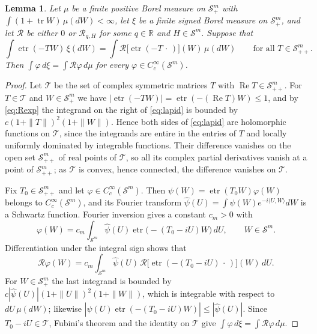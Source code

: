 \documentclass{amsart}
\newtheorem{lemma}[theorem]{Lemma}
\theoremstyle{definition}
\theoremstyle{remark}
\numberwithin{equation}{section}
\newcommand{\R}{\mathbb{R}}
\newcommand{\Sym}{\mathcal{S}}
\newcommand{\Rop}{\mathcal{R}}
\newcommand{\tr}{\operatorname{tr}}
\newcommand{\etr}{\operatorname{etr}}
\newcommand{\ip}[2]{\langle #1,#2\rangle}
\begin{document}
\begin{lemma}\label{lem:fourier}
Let $\mu$ be a finite positive Borel measure on $\Sym^m_+$ with $\int(1+\tr W)\,\mu(dW)<\infty$, let $\xi$ be a finite signed Borel measure on $\Sym^m_+$, and let $\Rop$ be either $0$ or $\Rop_{q,H}$ for some $q\in\R$ and $H\in\Sym^m$. Suppose that
\begin{equation}\label{eq:lapid}
\int\etr(-TW)\,\xi(dW)=\int\Rop\bigl[\etr(-T\,\cdot\,)\bigr](W)\,\mu(dW)\qquad\text{for all }T\in\Sym^m_{++}.
\end{equation}
Then $\int\varphi\,d\xi=\int\Rop\varphi\,d\mu$ for every $\varphi\in C_c^\infty(\Sym^m)$.
\end{lemma}

\begin{proof}
Let $\mathcal T$ be the set of complex symmetric matrices $T$ with $\operatorname{Re}T\in\Sym^m_{++}$. For $T\in\mathcal T$ and $W\in\Sym^m_+$ we have $|\etr(-TW)|=\etr(-(\operatorname{Re}T)W)\le1$, and by \eqref{eq:Rexp} the integrand on the right of \eqref{eq:lapid} is bounded by $c(1+\|T\|)^2(1+\|W\|)$. Hence both sides of \eqref{eq:lapid} are holomorphic functions on $\mathcal T$, since the integrands are entire in the entries of $T$ and locally uniformly dominated by integrable functions. Their difference vanishes on the open set $\Sym^m_{++}$ of real points of $\mathcal T$, so all its complex partial derivatives vanish at a point of $\Sym^m_{++}$; as $\mathcal T$ is convex, hence connected, the difference vanishes on $\mathcal T$.

Fix $T_0\in\Sym^m_{++}$ and let $\varphi\in C_c^\infty(\Sym^m)$. Then $\psi(W)=\etr(T_0W)\varphi(W)$ belongs to $C_c^\infty(\Sym^m)$, and its Fourier transform $\hat\psi(U)=\int\psi(W)e^{-i\ip UW}dW$ is a Schwartz function. Fourier inversion gives a constant $c_m>0$ with
\[
\varphi(W)=c_m\int_{\Sym^m}\hat\psi(U)\etr\bigl(-(T_0-iU)W\bigr)\,dU,\qquad W\in\Sym^m.
\]
Differentiation under the integral sign shows that
\[
\Rop\varphi(W)=c_m\int_{\Sym^m}\hat\psi(U)\,\Rop\bigl[\etr(-(T_0-iU)\,\cdot\,)\bigr](W)\,dU .
\]
For $W\in\Sym^m_+$ the last integrand is bounded by $c|\hat\psi(U)|(1+\|U\|)^2(1+\|W\|)$, which is integrable with respect to $dU\,\mu(dW)$; likewise $|\hat\psi(U)\etr(-(T_0-iU)W)|\le|\hat\psi(U)|$. Since $T_0-iU\in\mathcal T$, Fubini's theorem and the identity on $\mathcal T$ give $\int\varphi\,d\xi=\int\Rop\varphi\,d\mu$.
\end{proof}
\end{document}
